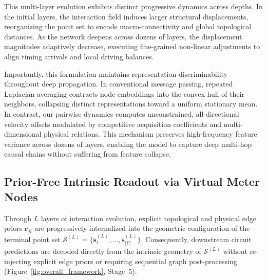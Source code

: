 This multi-layer evolution exhibits distinct progressive dynamics across depths. In the initial layers, the interaction field induces larger structural displacements, reorganizing the point set to encode macro-connectivity and global topological distances. As the network deepens across dozens of layers, the displacement magnitudes adaptively decrease, executing fine-grained non-linear adjustments to align timing arrivals and local driving balances.

Importantly, this formulation maintains representation discriminability throughout deep propagation. In conventional message passing, repeated Laplacian averaging contracts node embeddings into the convex hull of their neighbors, collapsing distinct representations toward a uniform stationary mean. In contrast, our pairwise dynamics computes unconstrained, all-directional velocity offsets modulated by competitive acquisition coefficients and multi-dimensional physical relations. This mechanism preserves high-frequency feature variance across dozens of layers, enabling the model to capture deep multi-hop causal chains without suffering from feature collapse.

\subsection{Prior-Free Intrinsic Readout via Virtual Meter Nodes}
\label{sec:method_readout}

Through $L$ layers of interaction evolution, explicit topological and physical edge priors $\mathbf{r}_{ji}$ are progressively internalized into the geometric configuration of the terminal point set $\mathcal{S}^{(L)} = \{\mathbf{s}_1^{(L)}, \dots, \mathbf{s}_{|\mathcal{V}|}^{(L)}\}$. Consequently, downstream circuit predictions are decoded directly from the intrinsic geometry of $\mathcal{S}^{(L)}$ without re-injecting explicit edge priors or requiring sequential graph post-processing (Figure~\ref{fig:overall_framework}, Stage~5).

